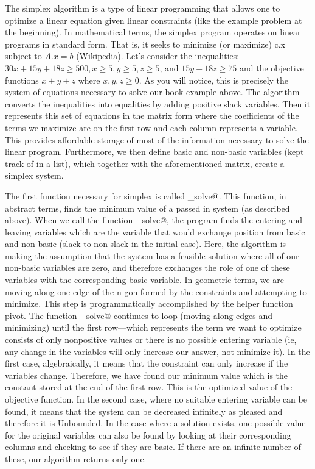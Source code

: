 \documentclass[letterpaper,11pt]{article}
\begin{document}
The simplex algorithm is a type of linear programming that allows one to
optimize a linear equation given linear constraints (like the example problem
at the beginning). In mathematical terms, the simplex program operates on
linear programs in standard form. That is, it seeks to minimize (or maximize)
c.x subject to $A.x = b$ (Wikipedia). Let's consider the inequalities: $30x +
15y + 18z \geq 500, x \geq 5,y \geq 5, z \geq 5$, and $15y+18z \geq 75$ and the objective
functions $x +y + z$ where $x, y, z \geq 0$. As you will notice, this is precisely
the system of equations necessary to solve our book example above. The
algorithm converts the inequalities into equalities by adding positive slack
variables. Then it represents this set of equations in the matrix form where
the coefficients of the terms we maximize are on the first row and each column
represents a variable. This provides affordable storage of most of the
information necessary to solve the linear program. Furthermore, we then define
basic and non-basic variables (kept track of in a list), which together with
the aforementioned matrix, create a simplex system.

The first function necessary for simplex is called \verb@simple_solve@. This
function, in abstract terms, finds the minimum value of a passed in system (as
described above). When we call the function \verb@simple_solve@, the program
finds the entering and leaving variables which are the variable that would
exchange position from basic and non-basic (slack to non-slack in the initial
case). Here, the algorithm is making the assumption that the system has a
feasible solution where all of our non-basic variables are zero, and therefore
exchanges the role of one of these variables with the corresponding basic
variable. In geometric terms, we are moving along one edge of the n-gon formed
by the constraints and attempting to minimize. This step is programmatically
accomplished by the helper function pivot. The function \verb@simple_solve@
continues to loop (moving along edges and minimizing) until the first
row---which represents the term we want to optimize consists of only nonpositive
values or there is no possible entering variable (ie, any change in the
variables will only increase our answer, not minimize it). In the first case,
algebraically, it means that the constraint can only increase if the variables
change. Therefore, we have found our minimum value which is the constant stored
at the end of the first row. This is the optimized value of the objective
function. In the second case, where no suitable entering variable can be found,
it means that the system can be decreased infinitely as pleased and therefore it
is Unbounded. In the case where a solution exists, one possible value for the
original variables can also be found by looking at their corresponding columns
and checking to see if they are basic. If there are an infinite number of these,
our algorithm returns only one. 
\end{document}
